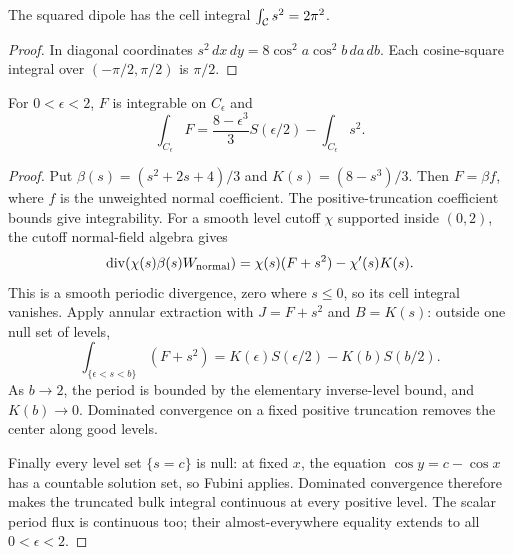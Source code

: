 \begin{lemma}
\label{lem:dd-weight-integral}
\leanok
The squared dipole has the cell integral $\int_{\mathcal{C}} s^2=2\pi^2$.
\end{lemma}

\begin{proof}
\leanok
In diagonal coordinates $s^2\,dx\,dy=8\cos^2a\cos^2b\,da\,db$.
Each cosine-square integral over $(-\pi/2,\pi/2)$ is $\pi/2$.
\end{proof}

\begin{lemma}
\label{lem:dd-coefficient-integral}
\leanok
For $0<\epsilon<2$, $F$ is integrable on $C_\epsilon$ and
\[
 \int_{C_\epsilon}F
 =\frac{8-\epsilon^3}{3}S(\epsilon/2)-\int_{C_\epsilon}s^2.
\]
\end{lemma}

\begin{proof}
\leanok
Put $\beta(s)=(s^2+2s+4)/3$ and $K(s)=(8-s^3)/3$.
Then $F=\beta f$, where $f$ is the unweighted normal coefficient.
The positive-truncation coefficient bounds give integrability.
For a smooth level cutoff $\chi$ supported inside $(0,2)$, the cutoff
normal-field algebra gives
\[
 \operatorname{div}(\chi(s)\beta(s)W_{\rm normal})
 =\chi(s)(F+s^2)-\chi'(s)K(s).
\]
This is a smooth periodic divergence, zero where $s\le0$, so its cell
integral vanishes. Apply annular extraction with $J=F+s^2$ and $B=K(s)$:
outside one null set of levels,
\[
 \int_{\{\epsilon<s<b\}}(F+s^2)
 =K(\epsilon)S(\epsilon/2)-K(b)S(b/2).
\]
As $b\to2$, the period is bounded by the elementary inverse-level bound,
and $K(b)\to0$. Dominated convergence on a fixed positive truncation removes
the center along good levels.

Finally every level set $\{s=c\}$ is null: at fixed $x$, the equation
$\cos y=c-\cos x$ has a countable solution set, so Fubini applies.
Dominated convergence therefore makes the truncated bulk integral continuous
at every positive level. The scalar period flux is continuous too; their
almost-everywhere equality extends to all $0<\epsilon<2$.
\end{proof}


